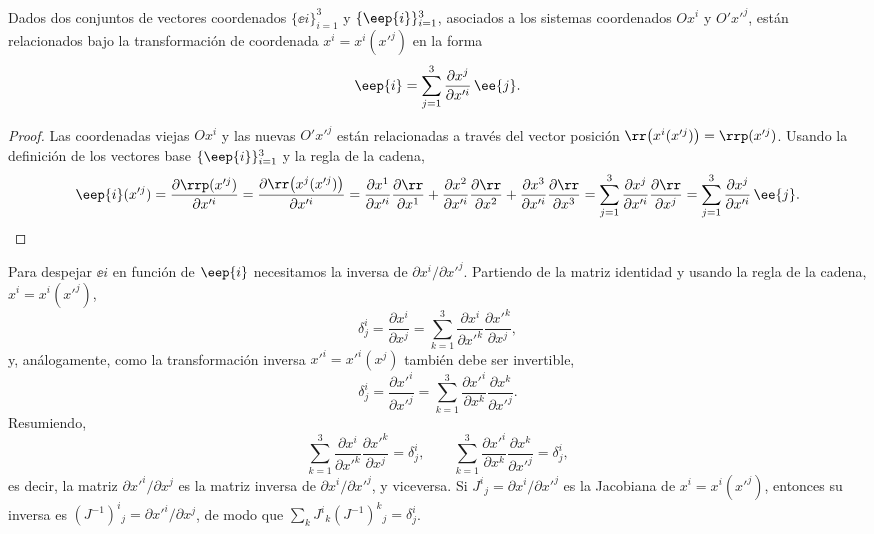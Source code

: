 \begin{proposicion}\label{prop:base}
Dados dos conjuntos de vectores coordenados $\{\ee{i}\}_{i=1}^{3}$ y $\{\eep{i}\}_{i=1}^{3}$, asociados a los sistemas coordenados $Ox^i$ y $O'x'^j$, están relacionados bajo la transformación de coordenada $x^i=x^i(x'^j)$ en la forma
\begin{equation}
\eep{i} = \sum_{j=1}^{3} \frac{\partial x^j}{\partial x'^i}\, \ee{j}.
\end{equation}
\end{proposicion}

\begin{proof}
Las coordenadas viejas $Ox^i$ y las nuevas $O'x'^j$ están relacionadas a través del vector posición $\rr\big(x^i(x'^j)\big)=\rrp(x'^j)$. Usando la definición de los vectores base $\{\eep{i}\}_{i=1}^3$ y la regla de la cadena,
\begin{equation}
\eep{i}(x'^j) = \frac{\partial \rrp(x'^j)}{\partial x'^i}
= \frac{\partial \rr\big(x^j(x'^j)\big)}{\partial x'^i}
= \frac{\partial x^1}{\partial x'^i}\frac{\partial \rr}{\partial x^1}
+ \frac{\partial x^2}{\partial x'^i}\frac{\partial \rr}{\partial x^2}
+ \frac{\partial x^3}{\partial x'^i}\frac{\partial \rr}{\partial x^3}
= \sum_{j=1}^{3}\frac{\partial x^j}{\partial x'^i}\frac{\partial \rr}{\partial x^j}
= \sum_{j=1}^{3}\frac{\partial x^j}{\partial x'^i}\, \ee{j}.
\end{equation}
\end{proof}

Para despejar $\ee{i}$ en función de $\eep{i}$ necesitamos la inversa de $\partial x^i/\partial x'^j$. Partiendo de la matriz identidad y usando la regla de la cadena, $x^i=x^i(x'^j)$,
\begin{equation}
\delta^i_j = \frac{\partial x^i}{\partial x^j}
= \sum_{k=1}^{3} \frac{\partial x^i}{\partial x'^k}\frac{\partial x'^k}{\partial x^j},
\end{equation}
y, análogamente, como la transformación inversa $x'^i=x'^i(x^j)$ también debe ser invertible,
\begin{equation}
\delta^i_j = \frac{\partial x'^i}{\partial x'^j} = \sum_{k=1}^{3}\frac{\partial x'^i}{\partial x^k}\frac{\partial x^k}{\partial x'^j}.
\end{equation}
Resumiendo,
\begin{equation}
\sum_{k=1}^{3}\frac{\partial x^i}{\partial x'^k}\frac{\partial x'^k}{\partial x^j}=\delta^i_j,
\qquad
\sum_{k=1}^{3}\frac{\partial x'^i}{\partial x^k}\frac{\partial x^k}{\partial x'^j}=\delta^i_j,
\end{equation}
es decir, la matriz $\partial x'^i/\partial x^j$ es la matriz inversa de $\partial x^i/\partial x'^j$, y viceversa. Si $J^i{}_j = \partial x^i/\partial x'^j$ es la Jacobiana de $x^i=x^i(x'^j)$, entonces su inversa es $(J^{-1})^i{}_j = \partial x'^i/\partial x^j$, de modo que $\sum_{k} J^i{}_k (J^{-1})^k{}_j = \delta^i_j$.

